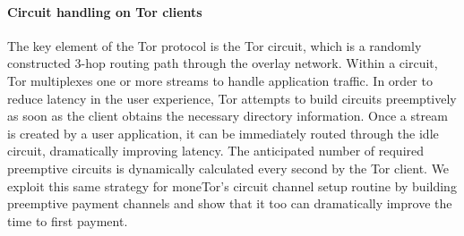\paragraph*{Circuit handling on Tor clients}
%

The key element of the Tor protocol is the Tor circuit, which is a randomly
constructed 3-hop routing path through the overlay network. Within a circuit,
Tor multiplexes one or more streams to handle application traffic. In order to
reduce latency in the user experience, Tor attempts to build circuits
preemptively as soon as the client obtains the necessary directory
information. Once a stream is created by a user application, it can be
immediately routed through the idle circuit, dramatically improving latency. The
anticipated number of required preemptive circuits is dynamically calculated
every second by the Tor client. We exploit this same strategy for moneTor's
circuit channel setup routine by building preemptive payment channels and
show that it too can dramatically improve the time to first payment.



